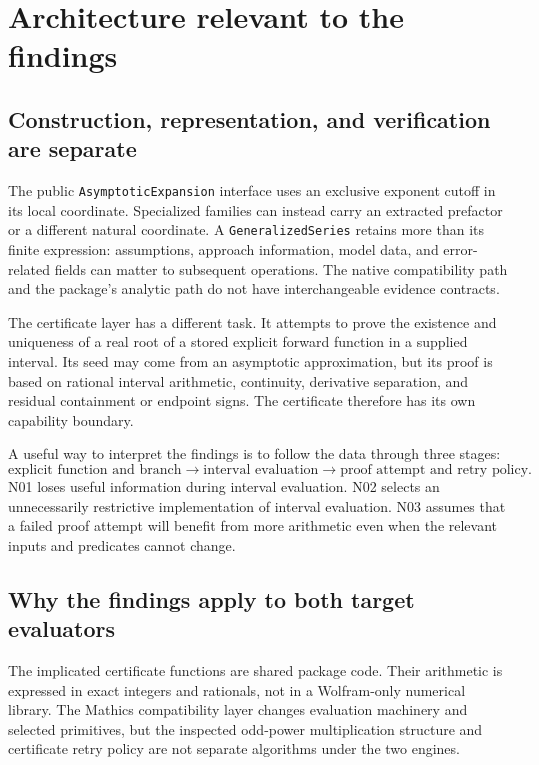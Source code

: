 \documentclass[11pt,a4paper]{article}
\newcommand{\code}[1]{\nolinkurl{#1}}
\begin{document}
\section{Architecture relevant to the findings}
\subsection{Construction, representation, and verification are separate}

The public \code{AsymptoticExpansion} interface uses an exclusive exponent cutoff in its local coordinate. Specialized families can instead carry an extracted prefactor or a different natural coordinate. A \code{GeneralizedSeries} retains more than its finite expression: assumptions, approach information, model data, and error-related fields can matter to subsequent operations. The native compatibility path and the package's analytic path do not have interchangeable evidence contracts.\cite{core}

The certificate layer has a different task. It attempts to prove the existence and uniqueness of a real root of a stored explicit forward function in a supplied interval. Its seed may come from an asymptotic approximation, but its proof is based on rational interval arithmetic, continuity, derivative separation, and residual containment or endpoint signs. The certificate therefore has its own capability boundary.\cite{cert}

A useful way to interpret the findings is to follow the data through three stages:
\[
\text{explicit function and branch}
\longrightarrow \text{interval evaluation}
\longrightarrow \text{proof attempt and retry policy}.
\]
N01 loses useful information during interval evaluation. N02 selects an unnecessarily restrictive implementation of interval evaluation. N03 assumes that a failed proof attempt will benefit from more arithmetic even when the relevant inputs and predicates cannot change.

\subsection{Why the findings apply to both target evaluators}

The implicated certificate functions are shared package code. Their arithmetic is expressed in exact integers and rationals, not in a Wolfram-only numerical library. The Mathics compatibility layer changes evaluation machinery and selected primitives, but the inspected odd-power multiplication structure and certificate retry policy are not separate algorithms under the two engines.\cite{cert,mathicscompat,mathicsnumerical}
\end{document}
